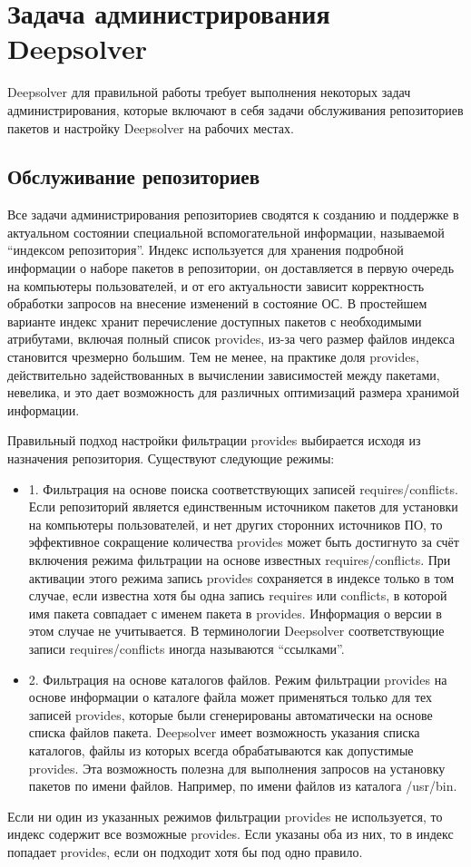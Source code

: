 \section{Задача администрирования Deepsolver}
Deepsolver для правильной работы требует выполнения некоторых задач 
администрирования, которые включают в себя задачи обслуживания репозиториев
 пакетов и настройку Deepsolver на рабочих местах.

\subsection{Обслуживание  репозиториев}
Все задачи администрирования репозиториев сводятся к созданию и поддержке в
актуальном состоянии специальной вспомогательной информации, называемой 
“индексом репозитория”. Индекс используется для хранения подробной информации 
о наборе пакетов в репозитории, он доставляется в первую очередь на компьютеры
пользователей, и от его актуальности зависит корректность обработки запросов 
на внесение изменений в состояние ОС. В простейшем варианте индекс
хранит перечисление доступных пакетов с необходимыми атрибутами, включая
полный список provides, из-за чего размер файлов индекса становится
чрезмерно большим. Тем не менее, на практике доля provides, действительно
задействованных в вычислении зависимостей между пакетами, невелика,
и это дает возможность для различных оптимизаций размера хранимой информации.

Правильный подход настройки фильтрации provides выбирается исходя
из назначения репозитория. Существуют следующие режимы:
\begin{itemize}
\item{1. Фильтрация на основе поиска соответствующих записей requires/conflicts.
Если репозиторий является единственным источником пакетов для установки
на компьютеры пользователей, и нет других сторонних источников ПО, 
то эффективное сокращение количества provides может быть
достигнуто за счёт включения режима фильтрации на основе известных
requires/conflicts. При активации этого режима запись provides сохраняется
в индексе только в том случае, если известна хотя бы одна запись
requires или conflicts, в которой имя пакета совпадает с именем пакета
в provides. Информация о версии в этом случае не учитывается. В терминологии 
Deepsolver соответствующие записи requires/conflicts иногда называются “ссылками”.}
\item{2. Фильтрация на основе каталогов файлов. Режим фильтрации provides
на основе информации о каталоге файла может применяться только для
тех записей provides, которые были сгенерированы автоматически на основе
 списка файлов пакета. Deepsolver имеет возможность указания списка
каталогов, файлы из которых всегда обрабатываются как допустимые
provides. Эта возможность полезна для выполнения запросов на установку
 пакетов по имени файлов. Например, по имени файлов из каталога
/usr/bin.}
\end{itemize}
Если ни один из указанных режимов фильтрации provides не используется,
то индекс содержит все возможные provides. Если указаны оба из них, то
в индекс попадает provides, если он подходит хотя бы под одно правило.

